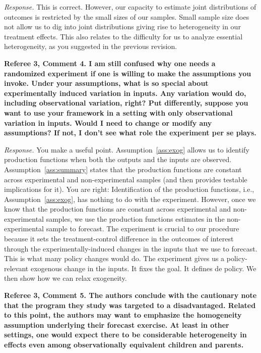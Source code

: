 \noindent \textit{Response.} This is correct. However, our capacity to estimate joint distributions of outcomes is restricted by the small sizes of our samples. Small sample size does not allow us to dig into joint distributions giving rise to heterogeneity in our treatment effects. This also relates to the difficulty for us to analyze essential heterogeneity, as you suggested in the previous revision.

\noindent \textbf{Referee 3, Comment 4. I am still confused why one needs a randomized experiment if one is willing to make the assumptions you invoke. Under your assumptions, what is so special about experimentally induced variation in inputs. Any variation would do, including observational variation, right? Put differently, suppose you want to use your framework in a setting with only observational variation in inputs. Would I need to change or modify any assumptions? If not, I don't see what role the experiment per se plays.}

\noindent \textit{Response.} You make a useful point. Assumption~\ref{ass:exog} allows us to identify production functions when both the outputs and the inputs are observed. Assumption~\ref{ass:summary} states that the production functions are constant across experimental and non-experimental samples (and then provides testable implications for it). You are right: Identification of the production functions, i.e., Assumption~\ref{ass:exog}, has nothing to do with the experiment. However, once we know that the production functions are constant across experimental and non-experimental samples, we use the production functions estimates in the non-experimental sample to forecast. The experiment is crucial to our procedure because it sets the treatment-control difference in the outcomes of interest through the experimentally-induced changes in the inputs that we use to forecast. This is what many policy changes would do. The experiment gives us a policy-relevant exogenous change in the inputs. It fixes the goal. It defines de policy. We then show how we can relax exogeneity.

\noindent \textbf{Referee 3, Comment 5. The authors conclude with the cautionary note that the program they study was targeted to a disadvantaged. Related to this point, the authors may want to emphasize the homogeneity assumption underlying their forecast exercise. At least in other settings, one would expect there to be considerable heterogeneity in effects even among observationally equivalent children and parents.}

